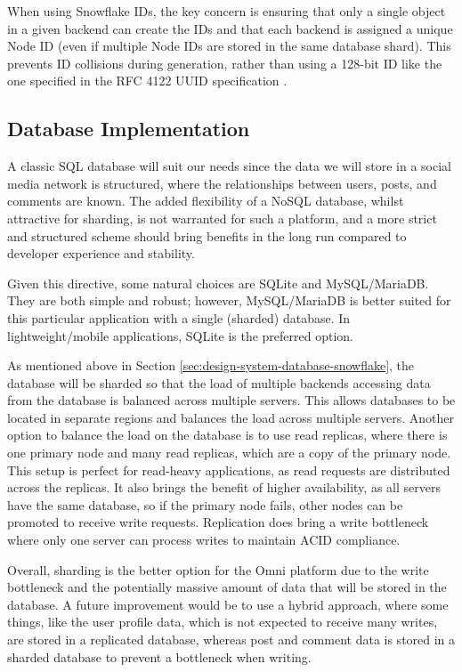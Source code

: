 When using Snowflake IDs, the key concern is ensuring that only a single object in a given backend can create the IDs and that each backend is assigned a unique Node ID (even if multiple Node IDs are stored in the same database shard). 
This prevents ID collisions during generation, rather than using a 128-bit ID like the one specified in the RFC 4122 UUID specification \citep{rfc4122}.

\subsection{Database Implementation}
A classic SQL database will suit our needs since the data we will store in a social media network is structured, where the relationships between users, posts, and comments are known.
The added flexibility of a NoSQL database, whilst attractive for sharding, is not warranted for such a platform, and a more strict and structured scheme should bring benefits in the long run compared to developer experience and stability.

Given this directive, some natural choices are SQLite and MySQL/MariaDB. They are both simple and robust; however, MySQL/MariaDB is better suited for this particular application with a single (sharded) database. In lightweight/mobile applications, SQLite is the preferred option.

As mentioned above in Section \ref{sec:design-system-database-snowflake}, the database will be sharded so that the load of multiple backends accessing data from the database is balanced across multiple servers. 
This allows databases to be located in separate regions and balances the load across multiple servers.
Another option to balance the load on the database is to use read replicas, where there is one primary node and many read replicas, which are a copy of the primary node.
This setup is perfect for read-heavy applications, as read requests are distributed across the replicas.
It also brings the benefit of higher availability, as all servers have the same database, so if the primary node fails, other nodes can be promoted to receive write requests.
Replication does bring a write bottleneck where only one server can process writes to maintain ACID compliance. 

Overall, sharding is the better option for the Omni platform due to the write bottleneck and the potentially massive amount of data that will be stored in the database.
A future improvement would be to use a hybrid approach, where some things, like the user profile data, which is not expected to receive many writes, are stored in a replicated database, whereas post and comment data is stored in a sharded database to prevent a bottleneck when writing.


